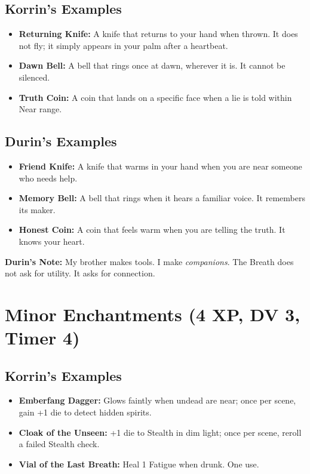 \documentclass[11pt]{book}
\begin{document}
\subsection*{Korrin's Examples}

\begin{itemize}
    \item \textbf{Returning Knife:} A knife that returns to your hand when thrown. It does not fly; it simply appears in your palm after a heartbeat.
    \item \textbf{Dawn Bell:} A bell that rings once at dawn, wherever it is. It cannot be silenced.
    \item \textbf{Truth Coin:} A coin that lands on a specific face when a lie is told within Near range.
\end{itemize}

\subsection*{Durin's Examples}

\begin{itemize}
    \item \textbf{Friend Knife:} A knife that warms in your hand when you are near someone who needs help.
    \item \textbf{Memory Bell:} A bell that rings when it hears a familiar voice. It remembers its maker.
    \item \textbf{Honest Coin:} A coin that feels warm when you are telling the truth. It knows your heart.
\end{itemize}

\vspace{0.5cm}
\textbf{Durin's Note:} My brother makes tools. I make \textit{companions}. The Breath does not ask for utility. It asks for connection.

\newpage
\section{Minor Enchantments (4 XP, DV 3, Timer 4)}

\subsection*{Korrin's Examples}

\begin{itemize}
    \item \textbf{Emberfang Dagger:} Glows faintly when undead are near; once per scene, gain +1 die to detect hidden spirits.
    \item \textbf{Cloak of the Unseen:} +1 die to Stealth in dim light; once per scene, reroll a failed Stealth check.
    \item \textbf{Vial of the Last Breath:} Heal 1 Fatigue when drunk. One use.
\end{itemize}
\end{document}
